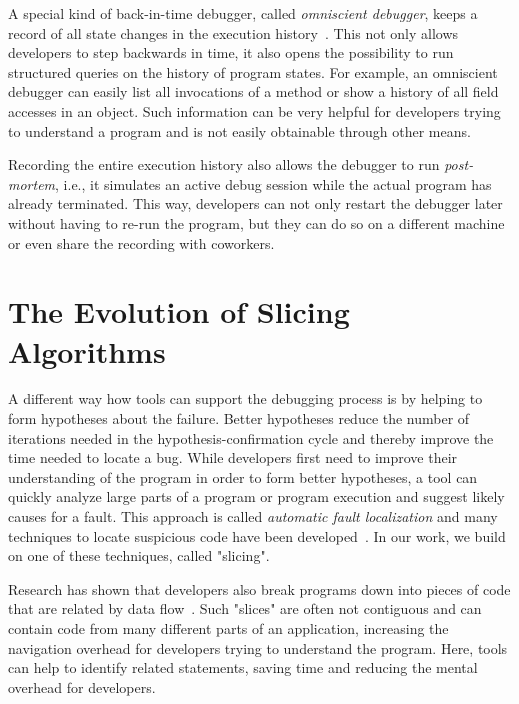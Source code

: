 A special kind of back-in-time debugger, called \emph{omniscient debugger}, keeps a record of all state changes in the execution history~\cite{lewis03:debugging_backwards_in_time}.
This not only allows developers to step backwards in time, it also opens the possibility to run structured queries on the history of program states.
For example, an omniscient debugger can easily list all invocations of a method or show a history of all field accesses in an object.
Such information can be very helpful for developers trying to understand a program and is not easily obtainable through other means.

Recording the entire execution history also allows the debugger to run \emph{post-mortem}, i.e., it simulates an active debug session while the actual program has already terminated.
This way, developers can not only restart the debugger later without having to re-run the program, but they can do so on a different machine or even share the recording with coworkers.


\section{The Evolution of Slicing Algorithms}

A different way how tools can support the debugging process is by helping to form hypotheses about the failure.
Better hypotheses reduce the number of iterations needed in the hypothesis-confirmation cycle and thereby improve the time needed to locate a bug.
While developers first need to improve their understanding of the program in order to form better hypotheses, a tool can quickly analyze large parts of a program or program execution and suggest likely causes for a fault.
This approach is called \emph{automatic fault localization} and many techniques to locate suspicious code have been developed~\cite{wong16:a_survey_on_software}.
In our work, we build on one of these techniques, called "slicing".

Research has shown that developers also break programs down into pieces of code that are related by data flow~\cite{weiser82:programmers_use_slices_when}.
Such "slices" are often not contiguous and can contain code from many different parts of an application, increasing the navigation overhead for developers trying to understand the program.
Here, tools can help to identify related statements, saving time and reducing the mental overhead for developers.


